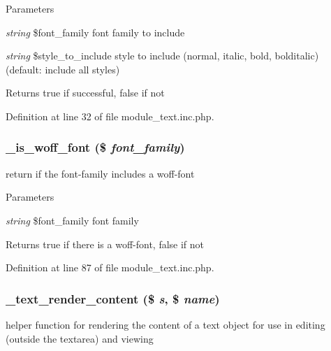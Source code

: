 \begin{DoxyParams}{Parameters}
\item[{\em string}]\$font\_\-family font family to include \item[{\em string}]\$style\_\-to\_\-include style to include (normal, italic, bold, bolditalic) (default: include all styles) \end{DoxyParams}
\begin{DoxyReturn}{Returns}
true if successful, false if not 
\end{DoxyReturn}


Definition at line 32 of file module\_\-text.inc.php.

\hypertarget{module__text_8inc_8php_a270432cf0918807ddfc6b698539d02e3}{
\subsubsection[{\_\-is\_\-woff\_\-font}]{\setlength{\rightskip}{0pt plus 5cm}\_\-is\_\-woff\_\-font (\$ {\em font\_\-family})}}
\label{module__text_8inc_8php_a270432cf0918807ddfc6b698539d02e3}
return if the font-\/family includes a woff-\/font


\begin{DoxyParams}{Parameters}
\item[{\em string}]\$font\_\-family font family \end{DoxyParams}
\begin{DoxyReturn}{Returns}
true if there is a woff-\/font, false if not 
\end{DoxyReturn}


Definition at line 87 of file module\_\-text.inc.php.

\hypertarget{module__text_8inc_8php_a0586b5e177a15f5904d49b8b3aaf19ee}{
\subsubsection[{\_\-text\_\-render\_\-content}]{\setlength{\rightskip}{0pt plus 5cm}\_\-text\_\-render\_\-content (\$ {\em s}, \/  \$ {\em name})}}
\label{module__text_8inc_8php_a0586b5e177a15f5904d49b8b3aaf19ee}
helper function for rendering the content of a text object for use in editing (outside the textarea) and viewing


